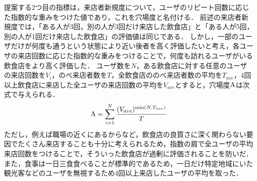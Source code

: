 提案する2つ目の指標は，来店者新規度について，ユーザのリピート回数に応じた指数的な重みをつけた値であり，これを穴場度と名付ける．
前述の来店者新規度では，「ある人が3回，別の人が3回だけ来店した飲食店」と「ある人が5回，別の人が1回だけ来店した飲食店」の評価値は同じである．
しかし，一部のユーザだけが何度も通うという状態により近い後者を高く評価したいと考え，各ユーザの来店回数に応じた指数的な重みをつけることで，何度も訪れるユーザがいる飲食店をより高く評価した．
ユーザ数を$N$，ある飲食店に対する任意のユーザの来店回数を$V_i$，のべ来店者数を$T$，全飲食店ののべ来店者数の平均を$T_{ave}$，4回以上飲食店に来店した全ユーザの来店回数の平均を$V_{ave}$とすると，穴場度$\rm A$は次式で与えられる．
\begin{equation}
	{\rm A} = \sum^{N}_{i=1} \frac{(V_{ave})^{{\rm min}(N,T_{ave})}}{T}
\end{equation}
ただし，例えば職場の近くにあるからなど，飲食店の良質さに深く関わらない要因でたくさん来店することも十分に考えられるため，指数の肩で全ユーザの平均来店回数をつけることで，そういった飲食店が過剰に評価されることを防いだ．
また，食事は一日三食食べることが標準的であるため，一日だけ特定地域にいた観光客などのユーザを無視するため4回以上来店したユーザの平均を取った．

